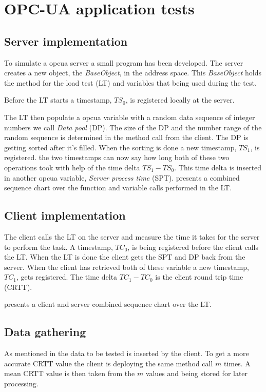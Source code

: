 \section{OPC-UA application tests} \label{appTests}

\subsection{Server implementation} \label{appTestsServerImpl}
To simulate a \acrshort{opcua} server a small program has been developed. The server creates a new object, the \textit{BaseObject}, in the address space. This \textit{BaseObject} holds the method for the load test (LT) and variables that being used during the test.

Before the LT starts a timestamp, $TS_0$, is registered locally at the server.

The LT then populate a \acrshort{opcua} variable with a random data sequence of integer numbers we call \textit{Data pool} (DP). The size of the DP and the number range of the random sequence is determined in the method call from the client. The DP is getting sorted after it's filled. When the sorting is done a new timestamp, $TS_1$, is registered. the two timestamps can now say how long both of these two operations took with help of the time delta $TS_1 - TS_0$. This time delta is inserted in another \acrshort{opcua} variable, \textit{Server process time} (SPT).  presents a combined sequence chart over the function and variable calls performed in the LT.


\subsection{Client implementation} \label{appTestsClientImpl}
The client calls the LT on the server and measure the time it takes for the server to perform the task.
A timestamp, $TC_0$, is being registered before the client calls the LT. When the LT is done the client gets the SPT and DP back from the server. When the client has retrieved both of these variable  a new timestamp, $TC_1$, gets registered. The time delta $TC_1 - TC_0$ is the client round trip time (CRTT).

  presents a client and server combined sequence chart over the LT.



\subsection{Data gathering} \label{appTestDataGath}
As mentioned in \textit{} the data to be tested is inserted by the client. To get a more accurate CRTT value the client is deploying the same method call $m$ times. A mean CRTT value is then taken from the $m$ values and being stored for later processing.